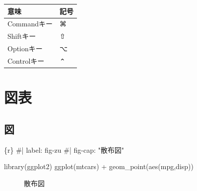 \documentclass[
  b5paper,
  xelatex, ja=standard]{bxjsbook}
\newenvironment{Shaded}{\begin{snugshade}}{\end{snugshade}}
\newcommand{\InformationTok}[1]{\textcolor[rgb]{0.37,0.37,0.37}{#1}}
\begin{document}
\begin{longtable}[]{@{}ll@{}}
\toprule\noalign{}
意味 & 記号 \\
\midrule\noalign{}
\endhead
\bottomrule\noalign{}
\endlastfoot
Commandキー & ⌘ \\
Shiftキー & ⇧ \\
Optionキー & ⌥ \\
Controlキー & ⌃ \\
\end{longtable}


\chapter{図表}\label{sec-caution}

\section{図}\label{ux56f3}

\begin{Shaded}
\begin{Highlighting}[]
\InformationTok{\textasciigrave{}\textasciigrave{}\textasciigrave{}\{r\}}
\InformationTok{\#| label: fig{-}zu}
\InformationTok{\#| fig{-}cap: "散布図"}

\InformationTok{library(ggplot2)}
\InformationTok{ggplot(mtcars) +}
\InformationTok{  geom\_point(aes(mpg,disp))}
\InformationTok{\textasciigrave{}\textasciigrave{}\textasciigrave{}}
\end{Highlighting}
\end{Shaded}

\begin{figure}[H]


\caption{\label{fig-zu}散布図}

\end{figure}%
\end{document}
